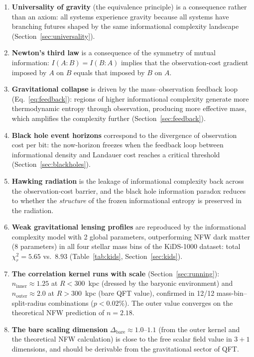 \documentclass[12pt,a4paper]{article}
\begin{document}
\begin{enumerate}
    \item \textbf{Universality of gravity} (the equivalence principle) is a consequence rather than an axiom: all systems experience gravity because all systems have branching futures shaped by the same informational complexity landscape (Section~\ref{sec:universality}).
    
    \item \textbf{Newton's third law} is a consequence of the symmetry of mutual information: $I(A:B) = I(B:A)$ implies that the observation-cost gradient imposed by $A$ on $B$ equals that imposed by $B$ on $A$.
    
    \item \textbf{Gravitational collapse} is driven by the mass--observation feedback loop (Eq.~\ref{eq:feedback}): regions of higher informational complexity generate more thermodynamic entropy through observation, producing more effective mass, which amplifies the complexity further (Section~\ref{sec:feedback}).
    
    \item \textbf{Black hole event horizons} correspond to the divergence of observation cost per bit: the now-horizon freezes when the feedback loop between informational density and Landauer cost reaches a critical threshold (Section~\ref{sec:blackholes}).
    
    \item \textbf{Hawking radiation} is the leakage of informational complexity back across the observation-cost barrier, and the black hole information paradox reduces to whether the \emph{structure} of the frozen informational entropy is preserved in the radiation.
    
    \item \textbf{Weak gravitational lensing profiles} are reproduced by the informational complexity model with 2 global parameters, outperforming NFW dark matter (8 parameters) in all four stellar mass bins of the KiDS-1000 dataset: total $\chi^2_r = 5.65$ vs.\ $8.93$ (Table~\ref{tab:kids}, Section~\ref{sec:kids}).
    
    \item \textbf{The correlation kernel runs with scale} (Section~\ref{sec:running}): $n_{\mathrm{inner}} \approx 1.25$ at $R < 300$~kpc (dressed by the baryonic environment) and $n_{\mathrm{outer}} \approx 2.0$ at $R > 300$~kpc (bare QFT value), confirmed in 12/12 mass-bin--split-radius combinations ($p < 0.02\%$). The outer value converges on the theoretical NFW prediction of $n = 2.18$.
    
    \item \textbf{The bare scaling dimension} $\Delta_{\mathrm{bare}} \approx 1.0$--$1.1$ (from the outer kernel and the theoretical NFW calculation) is close to the free scalar field value in $3+1$ dimensions, and should be derivable from the gravitational sector of QFT.
\end{enumerate}
\end{document}
